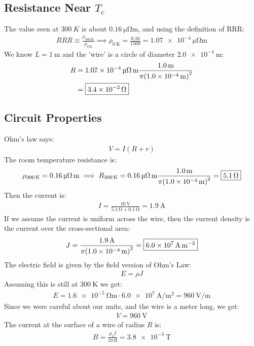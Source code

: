 \documentclass[12pt]{article}
\begin{document}
\subsection{Resistance Near $T_c$}
The value seen at $\SI{300}{K}$ is about $\SI{0.16}{\micro\ohm\m}$, and using the definition of RRR:
\begin{align*}
  RRR\equiv\frac{\rho_{\SI{300}{\K}}}{\rho_{\SI{0}{\K}}}\implies\rho_{\SI{0}{\K}}
  =\frac{0.16}{1500}=\SI{1.07e-4}{\micro\ohm\meter}
\end{align*}
We know $L=\SI{1}{\m}$ and the 'wire' is a circle of diameter $\SI{2.0e-4}{\m}$:
\begin{align*}
  R&=\SI{1.07e-4}{\micro\ohm\m}\frac{\SI{1.0}{\m}}{\pi\qty(\SI{1.0e-4}{\m})^2}\\
  &=\boxed{\SI{3.4e-2}{\ohm}}
\end{align*}
\subsection{Circuit Properties}
Ohm's law says:
\begin{align*}
  V=I(R+r)
\end{align*}
The room temperature resistance is:
\begin{align*}
  \rho_{\SI{300}{K}}=\SI{0.16}{\micro\ohm\meter}\implies
  R_{\SI{300}{\K}}=\SI{0.16}{\micro\ohm\meter}
  \frac{\SI{1.0}{\m}}{\pi\qty(\SI{1.0e-4}{\m})^2}=\boxed{\SI{5.1}{\ohm}}
\end{align*}
Then the current is:
\begin{align*}
  I=\frac{\SI{10}{\V}}{\SI{5.1}{\ohm}+\SI{0.1}{\ohm}}=\boxed{\SI{1.9}{\A}}
\end{align*}
If we assume the current is uniform across the wire, then the current density is the current over the cross-sectional area:
\begin{align*}
  J=\frac{\SI{1.9}{\A}}{\pi\qty(\SI{1.0e-4}{\m})^2}=
  \boxed{\SI{6.0e7}{\A\per\square\m}}
\end{align*}
The electric field is given by the field version of Ohm's Law:
\begin{align*}
  E=\rho J
\end{align*}
Assuming this is still at $\SI{300}{\K}$ we get:
\begin{align*}
  E=\SI{1.6e-5}{\ohm\meter}\cdot\SI{6.0e7}{\A\per\square\meter}=
  \boxed{\SI{960}{\V\per\m}}
\end{align*}
Since we were careful about our units, and the wire is a meter long, we get:
\begin{align*}
  \boxed{V=\SI{960}{\V}}
\end{align*}
The current at the surface of a wire of radius $R$ is:
\begin{align*}
  B=\frac{\mu_0I}{2\pi R}=\boxed{\SI{3.8e-3}{\tesla}}
\end{align*}
\end{document}
